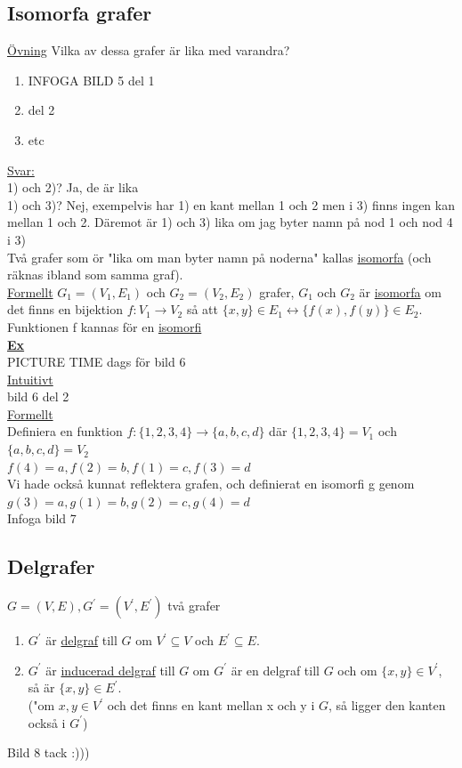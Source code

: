 \documentclass{article}
\begin{document}
    \subsection{Isomorfa grafer}
    \underline{Övning} Vilka av dessa grafer är lika med varandra?
    \begin{enumerate}
        \item INFOGA BILD 5 del 1
        \item del 2
        \item etc
    \end{enumerate}
    \underline{Svar:}\\
    1) och 2)? Ja, de är lika\\
    1) och 3)? Nej, exempelvis har 1) en kant mellan 1 och 2 men i 3) finns ingen kan mellan 1 och 2. Däremot är 1) och 3) lika om jag byter namn på nod 1 och nod 4 i 3)\\
    Två grafer som ör "lika om man byter namn på noderna" kallas \underline{isomorfa} (och räknas ibland som samma graf).\\
    \underline{Formellt} $G_{1}=(V_{1}, E_{1})$ och $G_{2}=(V_{2}, E_{2})$ grafer, $G_{1}$ och $G_{2}$ är \underline{isomorfa} om det finns en bijektion $f:V_{1}\rightarrow V_{2}$ så att $\{x,y\}\in E_{1}\leftrightarrow \{f(x),f(y)\}\in E_{2}$. Funktionen f kannas för en \underline{isomorfi}\\
    \underline{\textbf{Ex}}\\
    PICTURE TIME dags för bild 6\\
    \underline{Intuitivt}\\
    bild 6 del 2\\
    \underline{Formellt}\\
    Definiera en funktion $f:\{1,2,3,4\}\rightarrow \{a, b, c, d\}$ där $\{1, 2, 3, 4\}=V_{1}$ och $\{a,b,c,d\}=V_{2}$\\
    $f(4)=a, f(2)=b, f(1)=c, f(3)=d$\\
    Vi hade också kunnat reflektera grafen, och definierat en isomorfi g genom $g(3)=a, g(1)=b, g(2)=c, g(4)=d$\\
    Infoga bild 7\\
    \subsection{Delgrafer}
    $G=(V,E), G^{\prime}=(V^{\prime},E^{\prime})$ två grafer
    \begin{enumerate}
        \item $G^{\prime}$ är \underline{delgraf} till $G$ om $V^{\prime}\subseteq V$ och $E^{\prime}\subseteq E$.
        \item $G^{\prime}$ är \underline{inducerad delgraf} till $G$ om $G^{\prime}$ är en delgraf till $G$ och om $\{x,y\}\in V^{\prime}$, så är $\{x,y\}\in E^{\prime}$.\\
        ("om $x,y\in V^{\prime}$ och det finns en kant mellan x och y i $G$, så ligger den kanten också i $G^{\prime}$)
    \end{enumerate}
    Bild 8 tack :)))
\end{document}
